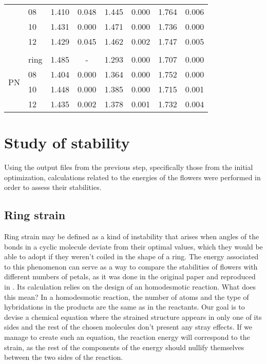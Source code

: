 \begin{table}
\begin{tabular}{@{}rlcccccc@{}}
        & 08 & 1.410 & 0.048 & 1.445 & 0.000 & 1.764 & 0.006 \\
        & 10 & 1.431 & 0.000 & 1.471 & 0.000 & 1.736 & 0.000 \\
        & 12 & 1.429 & 0.045 & 1.462 & 0.002 & 1.747 & 0.005 \\
        \\
        \multirow{4}{*}{PN} & ring & 1.485 & - & 1.293 & 0.000 & 1.707 & 0.000 \\
        & 08 & 1.404 & 0.000 & 1.364 & 0.000 & 1.752 & 0.000 \\
        & 10 & 1.448 & 0.000 & 1.385 & 0.000 & 1.715 & 0.001 \\
        & 12 & 1.435 & 0.002 & 1.378 & 0.001 & 1.732 & 0.004 \\
        \bottomrule
    \end{tabular}
\end{table}


\section{Study of stability}

Using the output files from the previous step, specifically those from the initial optimization, calculations related to the energies of the flowers were performed in order to assess their stabilities.

\subsection{Ring strain}
Ring strain may be defined as a kind of instability that arises when angles of the bonds in a cyclic molecule deviate from their optimal values, which they would be able to adopt if they weren't coiled in the shape of a ring.
The energy associated to this phenomenon can serve as a way to compare the stabilities of flowers with different numbers of petals, as it was done in the original paper and reproduced in .
Its calculation relies on the design of an homodesmotic reaction.
What does this mean?
In a homodesmotic reaction, the number of atoms and the type of hybridations in the products are the same as in the reactants.
Our goal is to devise a chemical equation where the strained structure appears in only one of its sides and the rest of the chosen molecules don't present any stray effects.
If we manage to create such an equation, the reaction energy will correspond to the strain, as the rest of the components of the energy should nullify themselves between the two sides of the reaction.

